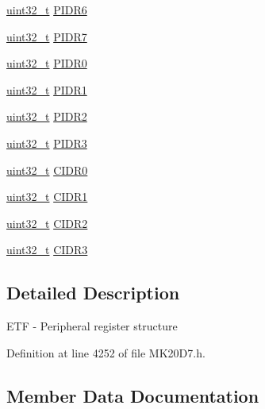 \begin{DoxyCompactItemize}
\item 
\hyperlink{_p_e___types_8h_a33594304e786b158f3fb30289278f5af}{uint32\+\_\+t} \hyperlink{struct_e_t_f___mem_map_a3448111767c72273ead546c08f49047b}{P\+I\+D\+R6}
\item 
\hyperlink{_p_e___types_8h_a33594304e786b158f3fb30289278f5af}{uint32\+\_\+t} \hyperlink{struct_e_t_f___mem_map_a53393d8ce48a43bed1d5568561776a5c}{P\+I\+D\+R7}
\item 
\hyperlink{_p_e___types_8h_a33594304e786b158f3fb30289278f5af}{uint32\+\_\+t} \hyperlink{struct_e_t_f___mem_map_a0ed9ad5240882ee853a4f4e8871c145f}{P\+I\+D\+R0}
\item 
\hyperlink{_p_e___types_8h_a33594304e786b158f3fb30289278f5af}{uint32\+\_\+t} \hyperlink{struct_e_t_f___mem_map_a70c724eb6523bbe1eedd98c71922cf65}{P\+I\+D\+R1}
\item 
\hyperlink{_p_e___types_8h_a33594304e786b158f3fb30289278f5af}{uint32\+\_\+t} \hyperlink{struct_e_t_f___mem_map_a4b3e618b1219f136bfd2e2846b1c1b1c}{P\+I\+D\+R2}
\item 
\hyperlink{_p_e___types_8h_a33594304e786b158f3fb30289278f5af}{uint32\+\_\+t} \hyperlink{struct_e_t_f___mem_map_a1132bf279f207a39e89f2fab3d384308}{P\+I\+D\+R3}
\item 
\hyperlink{_p_e___types_8h_a33594304e786b158f3fb30289278f5af}{uint32\+\_\+t} \hyperlink{struct_e_t_f___mem_map_aa11e0d070ab0917209b9dbd000f0dd3f}{C\+I\+D\+R0}
\item 
\hyperlink{_p_e___types_8h_a33594304e786b158f3fb30289278f5af}{uint32\+\_\+t} \hyperlink{struct_e_t_f___mem_map_af7c4231d402d34bc78649e996d0595a5}{C\+I\+D\+R1}
\item 
\hyperlink{_p_e___types_8h_a33594304e786b158f3fb30289278f5af}{uint32\+\_\+t} \hyperlink{struct_e_t_f___mem_map_aa4497a28e03196ee5a3d4c6cf8a7892f}{C\+I\+D\+R2}
\item 
\hyperlink{_p_e___types_8h_a33594304e786b158f3fb30289278f5af}{uint32\+\_\+t} \hyperlink{struct_e_t_f___mem_map_a8ff6c84678887a89964218abe295b05f}{C\+I\+D\+R3}
\end{DoxyCompactItemize}


\subsection{Detailed Description}
E\+TF -\/ Peripheral register structure 

Definition at line 4252 of file M\+K20\+D7.\+h.



\subsection{Member Data Documentation}

